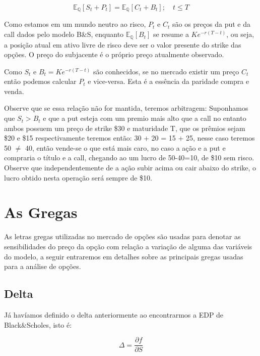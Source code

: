 \documentclass[]{book}
\begin{document}
\begin{equation}
\mathbb{E_Q}[S_t + P_t] = \mathbb{E_Q}[C_t + B_t]; \quad t \leq T
\label{eq:parity}
\end{equation}

Como estamos em um mundo neutro ao risco, \(P_t\) e \(C_t\) são os
preços da put e da call dados pelo modelo B\&S, enquanto
\(\mathbb{E_Q}[B_t]\) se resume a \(Ke^{-r(T-t)}\), ou seja, a posição
atual em ativo livre de risco deve ser o valor presente do strike das
opções. O preço do subjacente é o próprio preço atualmente observado.

Como \(S_t\) e \(B_t=Ke^{-r(T-t)}\) são conhecidos, se no mercado
existir um preço \(C_t\) então podemos calcular \(P_t\) e vice-versa.
Esta é a essência da paridade compra e venda.

Observe que se essa relação não for mantida, teremos arbitragem:
Suponhamos que \(S_t > B_t\) e que a put esteja com um premio mais alto
que a call no entanto ambos possuem um preço de strike {\$}30 e
maturidade T, que os prêmios sejam {\$}20 e {\$}15 respectivamente
teremos então: 30 + 20 = 15 + 25, nesse caso teremos 50 \(\neq\) 40,
então vende-se o que está mais caro, no caso a ação e a put e compraria
o título e a call, chegando ao um lucro de 50-40=10, de {\$}10 sem
risco. Observe que independentemente de a ação subir acima ou cair
abaixo do strike, o lucro obtido nesta operação será sempre de {\$}10.

\section{As Gregas}\label{gregas}

As letras gregas utilizadas no mercado de opções são usadas para denotar
as sensibilidades do preço da opção com relação a variação de alguma das
variáveis do modelo, a seguir entraremos em detalhes sobre as principais
gregas usadas para a análise de opções.

\subsection{Delta}\label{delta}

Já havíamos definido o delta anteriormente ao encontrarmos a EDP de
Black\&Scholes, isto é:

\begin{equation}
\Delta = \frac{\partial f}{\partial S}
\label{eq:delta}
\end{equation}
\end{document}
